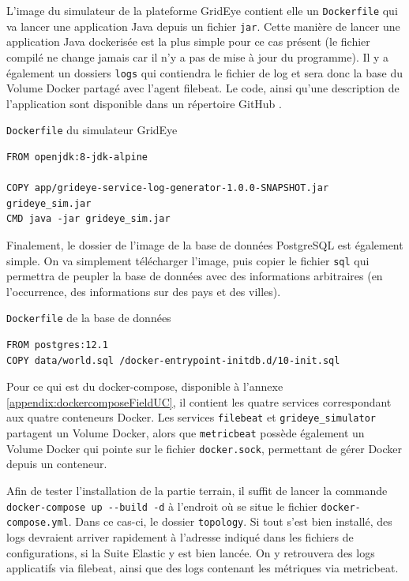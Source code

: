\documentclass[paper=a4, fontsize=11pt]{scrartcl}
\begin{document}
L'image du simulateur de la plateforme GridEye contient elle un \verb,Dockerfile, qui va lancer une application Java depuis un fichier \verb,jar,. Cette manière de lancer une application Java dockerisée est la plus simple pour ce cas présent (le fichier compilé ne change jamais car il n'y a pas de mise à jour du programme). Il y a également un dossiers \verb,logs, qui contiendra le fichier de log et sera donc la base du Volume Docker partagé avec l'agent filebeat. Le code, ainsi qu'une description de l'application sont disponible dans un répertoire GitHub \cite{jael24_jael24tb_grideye_simulator_2020}.

\verb,Dockerfile, du simulateur GridEye
\begin{lstlisting}
FROM openjdk:8-jdk-alpine

COPY app/grideye-service-log-generator-1.0.0-SNAPSHOT.jar grideye_sim.jar
CMD java -jar grideye_sim.jar
\end{lstlisting}

Finalement, le dossier de l'image de la base de données PostgreSQL est également simple. On va simplement télécharger l'image, puis copier le fichier \verb,sql, qui permettra de peupler la base de données avec des informations arbitraires (en l'occurrence, des informations sur des pays et des villes).

\verb,Dockerfile, de la base de données
\begin{lstlisting}
FROM postgres:12.1
COPY data/world.sql /docker-entrypoint-initdb.d/10-init.sql
\end{lstlisting}

Pour ce qui est du docker-compose, disponible à l'annexe \ref{appendix:dockercomposeFieldUC}, il contient les quatre services correspondant aux quatre conteneurs Docker. Les services \verb,filebeat, et \verb,grideye_simulator, partagent un Volume Docker, alors que \verb,metricbeat, possède également un Volume Docker qui pointe sur le fichier \verb,docker.sock,, permettant de gérer Docker depuis un conteneur.

Afin de tester l'installation de la partie terrain, il suffit de lancer la commande \verb,docker-compose up --build -d, à l’endroit où se situe le fichier \verb,docker-compose.yml,. Dans ce cas-ci, le dossier \verb,topology,. Si tout s'est bien installé, des logs devraient arriver rapidement à l'adresse indiqué dans les fichiers de configurations, si la Suite Elastic y est bien lancée. On y retrouvera des logs applicatifs via filebeat, ainsi que des logs contenant les métriques via metricbeat.
\end{document}
